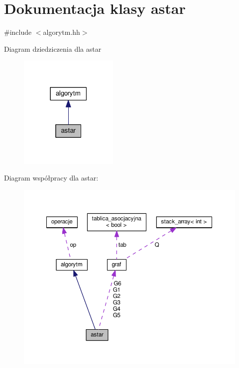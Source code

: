 \hypertarget{classastar}{\section{Dokumentacja klasy astar}
\label{classastar}
}


{\ttfamily \#include $<$algorytm.\-hh$>$}



Diagram dziedziczenia dla astar\nopagebreak
\begin{figure}[H]
\begin{center}
\leavevmode
\includegraphics[width=134pt]{classastar__inherit__graph}
\end{center}
\end{figure}


Diagram współpracy dla astar\-:\nopagebreak
\begin{figure}[H]
\begin{center}
\leavevmode
\includegraphics[width=350pt]{classastar__coll__graph}
\end{center}
\end{figure}
